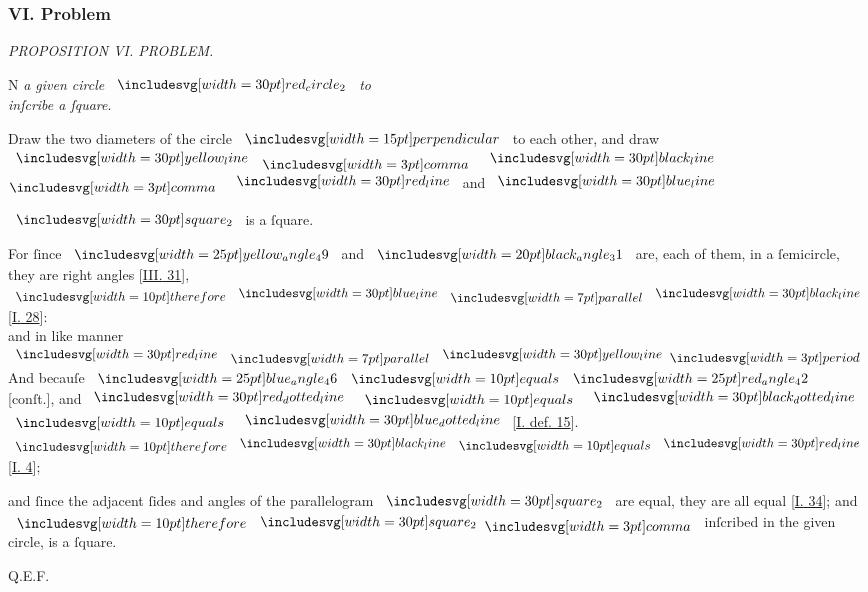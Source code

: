 \documentclass[12pt,preview]{standalone}
\begin{document}
\subsubsection{VI. Problem}

\begin{minipage}[t]{0.54\textwidth}
    \begin{center}
        \textit{PROPOSITION VI. PROBLEM.}\label{book4pr6} \\
    \end{center}

    \hfill

    \begin{center}
        \raggedright \lettrine[lines=3, loversize=1, nindent=0pt]{}{}N \textit{a given circle} $\img[0][0][30]{red_circle_2}$ \textit{to\\ inſcribe a ſquare}.
    \end{center}
\end{minipage}%
\hfill
\begin{minipage}[t]{0.43\textwidth}
    \vspace{0pt}
    
\end{minipage}%

\begin{center}
    Draw the two diameters of the circle $\bperp$ to each other, and draw $\yellowline$ $\bcomma$ $\blackline$ $\bcomma$ $\redline$ and $\blueline$
\end{center}

\begin{center}
    $\img[0][0][30]{square_2}$ is a ſquare.
\end{center}

\begin{center}
    For ſince $\img{yellow_angle_49}$ and $\img[0][0][20]{black_angle_31}$ are, each of them, in a ſemicircle, they are right angles [\hyperref[book3pr31]{\textsc{III.} 31}],
    $\btherefore \blueline \bparallel \blackline$ [\hyperref[book1pr28]{\textsc{I.} 28}]:\\
    and in like manner $\redline \bparallel \yellowline \bperiod$
    \hfill\\
    And becauſe $\img{blue_angle_46} \bequals \img{red_angle_42}$ [conſt.], and $\dottedredline$ $\bequals$ $\dottedblackline$ $\bequals$ $\dottedblueline$ [\hyperref[book1def15]{\textsc{I.} def. 15}]. $\btherefore \blackline \bequals \redline$ [\hyperref[book1pr4]{\textsc{I.} 4}];
\end{center}

and ſince the adjacent ſides and angles of the parallelogram $\img[0][0][30]{square_2}$ are equal, they are all equal [\hyperref[book1pr34]{\textsc{I.} 34}]; and $\btherefore \img[0][0][30]{square_2} \bcomma$ inſcribed in the given circle, is a ſquare.

\hfill Q.E.F.
\end{document}
